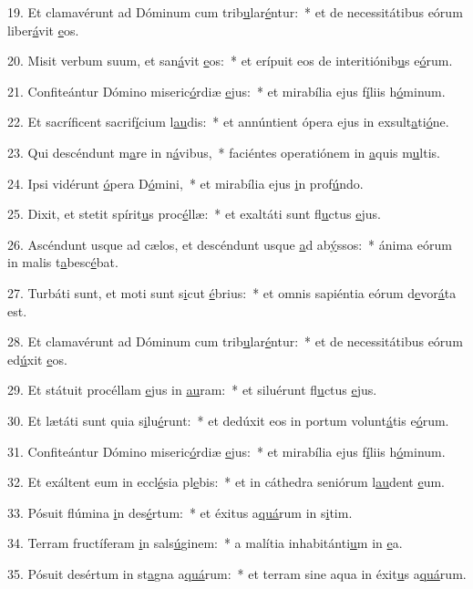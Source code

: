 19. Et clamavérunt ad Dóminum cum trib\uline{u}lar\uline{é}ntur:~* et de necessitátibus eórum liber\uline{á}vit \uline{e}os.\par 
20. Misit verbum suum, et san\uline{á}vit \uline{e}os:~* et erípuit eos de interitiónib\uline{u}s e\uline{ó}rum.\par 
21. Confiteántur Dómino miseric\uline{ó}rdiæ \uline{e}jus:~* et mirabília ejus f\uline{í}liis h\uline{ó}minum.\par 
22. Et sacríficent sacrif\uline{í}cium l\uline{au}dis:~* et annúntient ópera ejus in exsult\uline{a}ti\uline{ó}ne.\par 
23. Qui descéndunt m\uline{a}re in n\uline{á}vibus,~* faciéntes operatiónem in \uline{a}quis m\uline{u}ltis.\par 
24. Ipsi vidérunt \uline{ó}pera D\uline{ó}mini,~* et mirabília ejus \uline{i}n prof\uline{ú}ndo.\par 
25. Dixit, et stetit spírit\uline{u}s proc\uline{é}llæ:~* et exaltáti sunt fl\uline{u}ctus \uline{e}jus.\par 
26. Ascéndunt usque ad cælos, et descéndunt usque \uline{a}d ab\uline{ý}ssos:~* ánima eórum in malis t\uline{a}besc\uline{é}bat.\par 
27. Turbáti sunt, et moti sunt s\uline{i}cut \uline{é}brius:~* et omnis sapiéntia eórum d\uline{e}vor\uline{á}ta est.\par 
28. Et clamavérunt ad Dóminum cum trib\uline{u}lar\uline{é}ntur:~* et de necessitátibus eórum ed\uline{ú}xit \uline{e}os.\par 
29. Et státuit procéllam \uline{e}jus in \uline{au}ram:~* et siluérunt fl\uline{u}ctus \uline{e}jus.\par 
30. Et lætáti sunt quia s\uline{i}lu\uline{é}runt:~* et dedúxit eos in portum volunt\uline{á}tis e\uline{ó}rum.\par 
31. Confiteántur Dómino miseric\uline{ó}rdiæ \uline{e}jus:~* et mirabília ejus f\uline{í}liis h\uline{ó}minum.\par 
32. Et exáltent eum in eccl\uline{é}sia pl\uline{e}bis:~* et in cáthedra seniórum l\uline{au}dent \uline{e}um.\par 
33. Pósuit flúmina \uline{i}n des\uline{é}rtum:~* et éxitus a\uline{quá}rum in s\uline{i}tim.\par 
34. Terram fructíferam \uline{i}n sals\uline{ú}ginem:~* a malítia inhabitánti\uline{u}m in \uline{e}a.\par 
35. Pósuit desértum in st\uline{a}gna a\uline{quá}rum:~* et terram sine aqua in éxit\uline{u}s a\uline{quá}rum.\par 

